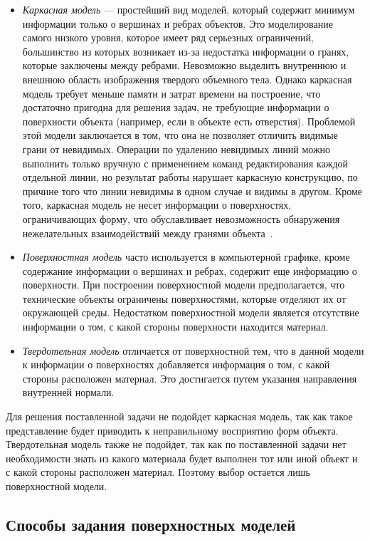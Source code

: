 \begin{itemize}
	\item \textit{Каркасная модель} --- простейший вид моделей, который содержит минимум информации только о вершинах и ребрах объектов. Это моделирование самого низкого уровня, которое имеет ряд серьезных ограничений, большинство из которых возникает из-за недостатка информации о гранях, которые заключены между ребрами. Невозможно выделить внутреннюю и внешнюю область изображения твердого объемного тела. Однако каркасная модель требует меньше памяти и затрат времени на построение, что достаточно пригодна для решения задач, не требующие информации о поверхности объекта (например, если в объекте есть отверстия). Проблемой этой модели заключается в том, что она не позволяет отличить видимые грани от невидимых. Операции по удалению невидимых линий можно выполнить только вручную с применением команд редактирования каждой отдельной линии, но результат работы нарушает каркасную конструкцию, по причине того что линии невидимы в одном случае и видимы в другом.
	Кроме того, каркасная модель не несет информации о поверхностях, ограничивающих форму, что обуславливает невозможность обнаружения нежелательных взаимодействий между гранями объекта~\cite{roders}.
	\item \textit{Поверхностная модель} часто используется в компьютерной графике, кроме содержание информации о вершинах и ребрах, содержит еще информацию о поверхности. При построении поверхностной модели предполагается, что технические объекты ограничены поверхностями, которые отделяют их от окружающей среды. 
	Недостатком поверхностной модели является отсутствие информации о том, с какой стороны поверхности находится материал.
	\item \textit{Твердотельная модель} отличается от поверхностной тем, что в данной модели к информации о поверхностях добавляется информация о том, с какой стороны расположен материал. Это достигается путем указания направления внутренней нормали.
\end{itemize}

Для решения поставленной задачи не подойдет каркасная модель, так как такое представление будет приводить к неправильному восприятию форм объекта. Твердотельная модель также не подойдет, так как по поставленной задачи нет необходимости знать из какого материала будет выполнен тот или иной объект и с какой стороны расположен материал. Поэтому выбор остается лишь поверхностной модели.

\subsection{Способы задания поверхностных моделей}


